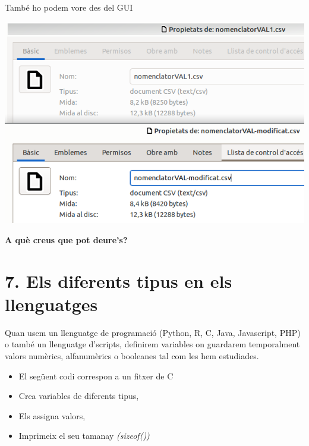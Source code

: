\documentclass[
  12 pt,
  a4paper,
]{article}
\providecommand{\tightlist}{%
  \setlength{\itemsep}{0pt}\setlength{\parskip}{0pt}}
\begin{document}
També ho podem vore des del GUI

\includegraphics{png/ls2.png}

\textbf{A què creus que pot deure's?}

\section{7. Els diferents tipus en els
llenguatges}\label{els-diferents-tipus-en-els-llenguatges}

Quan usem un llenguatge de programació (Python, R, C, Java, Javascript,
PHP) o també un llenguatge d'scripts, definirem variables on guardarem
temporalment valors numèrics, alfanumèrics o booleanes tal com les hem
estudiades.

\begin{itemize}
\tightlist
\item
  El següent codi correspon a un fitxer de C
\item
  Crea variables de diferents tipus,
\item
  Els assigna valors,
\item
  Imprimeix el seu tamanay \emph{(sizeof())}
\end{itemize}
\end{document}
